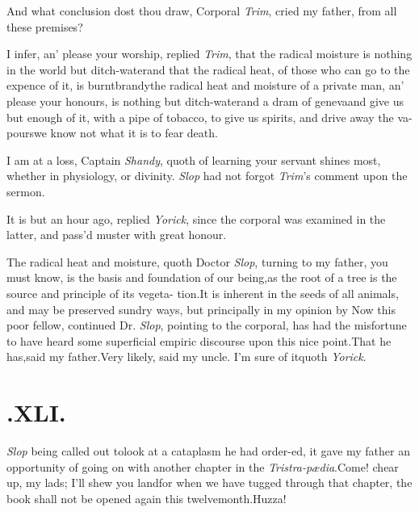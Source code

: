 \documentclass{article}
\begin{document}
And what conclusion dost thou draw, Corporal \textit{Trim}, cried
my father, from all these premises?

I infer, an’ please your worship, re\-plied \textit{Trim},
that the radical moisture is nothing in the world but
ditch-water\tsh\break and that the radical heat, of those who can go to
the expence of it, is burnt\break brandy\tsk the radical heat and
moisture of a private man, an’ please your honours, is nothing
but ditch-water\tsk and a dram of geneva\tsh and give us
but enough of it, with a pipe of tobacco, to give us spirits, and
drive away the va- pours\tsk we know not what it is to fear
death.

I am at a loss, Captain \textit{Shandy}, quoth 
of learning your servant shines most,\break
whether in physiology, or divinity.\tsk\break
\textit{Slop} had not forgot \textit{Trim}’s comment\break
upon the sermon.\tsk

It is but an hour ago, replied \textit{Yorick}, since the corporal
was examined in the latter, and pass’d muster with great\break
honour.\tsh

The radical heat and moisture, quoth Doctor \textit{Slop}, turning
to my father, you must know, is the basis and foundation of our
being,\tsk as the root of a tree is the source and principle of
its vegeta-
tion.\tsk It is inherent in the seeds of all animals, and may be
preserved sundry ways, but principally in my opinion by
\tsh Now this poor fellow, continued Dr.\@
\textit{Slop}, pointing to the corporal, has had the misfortune
to have heard some superficial empiric discourse upon this nice
point.\tsh That he has,\tsk said my father.\tsh Very likely,
said my uncle.\break
\tsk I’m sure of it\tsk quoth \textit{Yorick}.\tsh

\smallskip

\section{.\enspace  XLI.}

 \textit{Slop} being called out
to\break look at a cataplasm he had order-\break ed, it gave my father an
opportunity of going on with another chapter in the\break
\textit{Tristra-pædia}.\tsh Come! chear up, my lads;
I’ll shew you land\tsh for when we have tugged
through that chapter,\break
the book shall not be opened again this\break
twelvemonth.\tsk Huzza!\tsk
\end{document}
